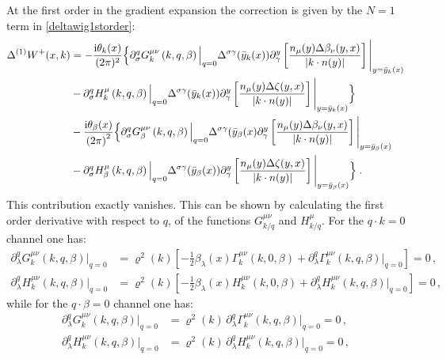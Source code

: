 \documentclass[prd,superscriptaddress,nofootinbib,notitlepage]{revtex4-1}
\newcommand{\ii}{{\rm i}}
\begin{document}
At the first order in the gradient expansion the correction is given by the $N=1$ term in \eqref{deltawig1storder}:
%
\begin{align*}
\Delta^{(1)} W^+(x,k) &= -\frac{\ii\theta_k(x)}{(2\pi)^2}\Big\{ 
\partial^q_\sigma G^{\mu\nu}_k\left(k,q,\beta\right)\Big|_{q=0}\Delta^{\sigma\gamma}(\bar{y}_k(x))\partial^y_\gamma 
\left[ \frac{n_{\mu}(y)\Delta\beta_{\nu}(y,x)}{|k\cdot n(y)|} \right] \Bigg|_{y=\bar y_k(x)}\nonumber\\
&-\partial^q_\sigma H^{\mu}_k\left(k,q,\beta\right)\Big|_{q=0}\Delta^{\sigma\gamma}(\bar{y}_k(x))\partial^y_\gamma 
\left[ \frac{n_{\mu}(y)\Delta\zeta(y,x)}{|k\cdot n(y)|} \right] \Bigg|_{y=\bar y_k(x)}\Big\} \nonumber \\
& -\frac{\ii\theta_\beta(x)}{\left(2\pi\right)^2}
\Big\{ \partial^q_\sigma G^{\mu\nu}_\beta\left(k,q,\beta\right)\Big|_{q=0}\Delta^{\sigma\gamma}(\bar{y}_\beta(x)\partial^y_\gamma 
\left[ \frac{n_{\mu}(y)\Delta\beta_{\nu}(y,x)}{|k\cdot n(y)|} \right] \Bigg|_{y=\bar y_\beta(x)}\nonumber\\
&-\partial^q_\sigma H^{\mu}_\beta\left(k,q,\beta\right)\Big|_{q=0}\Delta^{\sigma\gamma}(\bar{y}_\beta(x))\partial^y_\gamma 
\left[ \frac{n_{\mu}(y)\Delta\zeta(y,x)}{|k\cdot n(y)|} \right] \Bigg|_{y=\bar y_\beta(x)}\Big\}\;.
\end{align*}
%
This contribution exactly vanishes. This can be shown by calculating the first order derivative with respect to $q$, 
of the functions $G^{\mu\nu}_{k/q}$ and $H^\mu_{k/q}$. For the $q\cdot k=0$ channel one has:
%
\begin{equation*}
    \begin{split}
        \partial^q_\lambda G^{\mu\nu}_k\left(k,q,\beta\right)\Big|_{q=0}&=\varrho^2(k)\left[-\frac{1}{2}\beta_\lambda(x) 
        \Gamma^{\mu\nu}_k\left(k,0,\beta\right)+\partial^q_\lambda\Gamma^{\mu\nu}_k\left(k,q,\beta\right)\Big|_{q=0}\right]=0\,,\\
        \partial^q_\lambda H^{\mu\nu}_k\left(k,q,\beta\right)\Big|_{q=0}&=\varrho^2(k)\left[-\frac{1}{2}\beta_\lambda(x) 
        H^{\mu\nu}_k\left(k,0,\beta\right)+\partial^q_\lambda H^{\mu\nu}_k\left(k,q,\beta\right)\Big|_{q=0}\right]=0\,,
    \end{split}
\end{equation*}
%
while for the $q\cdot\beta=0$ channel one has:
%
\begin{equation*}
    \begin{split}
        \partial^q_\lambda G^{\mu\nu}_k\left(k,q,\beta\right)\Big|_{q=0}&=\varrho^2(k)\,\partial^q_\lambda\Gamma^{\mu\nu}_k\left(k,q,\beta\right)\Big|_{q=0}=0\,,\\
        \partial^q_\lambda H^{\mu\nu}_k\left(k,q,\beta\right)\Big|_{q=0}&=\varrho^2(k)\,\partial^q_\lambda H^{\mu\nu}_k\left(k,q,\beta\right)\Big|_{q=0}=0\,,
    \end{split}
\end{equation*}
\end{document}
